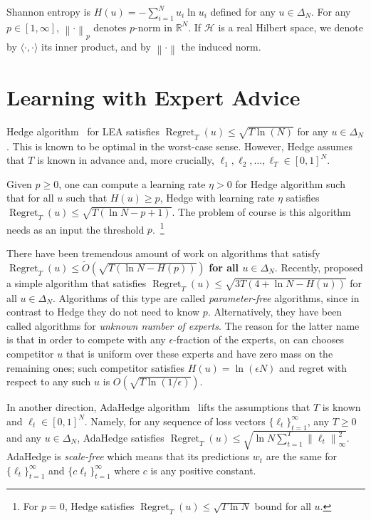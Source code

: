 \documentclass{colt2016} %
\DeclareMathOperator{\Regret}{Regret}
\newcommand{\R}{\mathbb{R}}     %
\renewcommand{\H}{\mathcal{H}}  %
\newcommand{\norm}[1]{\left\|{#1}\right\|}
\begin{document}
Shannon entropy is $H(u) = -\sum_{i=1}^N u_i \ln u_i$ defined for any $u \in
\Delta_N$. For any $p \in [1,\infty]$, $\norm{\cdot}_p$ denotes $p$-norm in
$\R^N$. If $\H$ is a real Hilbert space, we denote by $\langle \cdot, \cdot
\rangle$ its inner product, and by $\norm{\cdot}$ the induced norm.

\section{Learning with Expert Advice}

Hedge algorithm~\citep{Freund-Schapire-1997} for LEA satisfies $\Regret_T(u)
\le \sqrt{T \ln(N)}$ for any $u \in \Delta_N$. This is known to be optimal in
the worst-case sense. However, Hedge assumes that $T$ is known in advance and,
more crucially, $\ell_1, \ell_2, \dots, \ell_T \in [0,1]^N$.

Given $p \ge 0$, one can compute a learning rate $\eta > 0$ for
Hedge algorithm such that for all $u$ such that $H(u) \ge p$, Hedge with
learning rate $\eta$ satisfies $\Regret_T(u) \le \sqrt{T (\ln N - p + 1)}$. The
problem of course is this algorithm needs as an input the threshold
$p$.~\footnote{For $p = 0$, Hedge satisfies  $\Regret_T(u) \le \sqrt{T \ln N}$
bound for all $u$.}

There have been tremendous amount of work \citep{Chaudhuri-Freund-Hsu-2009,
Chernov-Vovk-2010, Koolen-van-Erven-2015, Luo-Schapire-2015} on algorithms that
satisfy $\Regret_T(u) \le \widetilde O(\sqrt{T (\ln N - H(p))})$ \textbf{for all
$u \in \Delta_N$}. Recently, \cite{Orabona-Pal-2016-parameter-free} proposed a
simple algorithm that satisfies $\Regret_T(u) \le \sqrt{3 T(4 + \ln N -
H(u))}$ for all $u \in \Delta_N$. Algorithms of this type are called
\emph{parameter-free} algorithms, since in contrast to Hedge they do not need
to know $p$. Alternatively, they have been called algorithms
for \emph{unknown number of experts}. The reason for the latter name is that in
order to compete with any $\epsilon$-fraction of the experts, on can chooses
competitor $u$ that is uniform over these experts and have zero mass on the
remaining ones; such competitor satisfies $H(u) = \ln (\epsilon N)$ and regret
with respect to any such $u$ is $O(\sqrt{T \ln(1/\epsilon)})$.

In another direction, AdaHedge
algorithm~\citep{de-Rooij-van-Erven-Grunwald-Koolen-2014} lifts the assumptions
that $T$ is known and $\ell_t \in [0,1]^N$. Namely, for any sequence of loss
vectors $\{\ell_t\}_{t=1}^\infty$, any $T \ge 0$ and any $u \in \Delta_N$,
AdaHedge satisfies $\Regret_T(u) \le \sqrt{\ln N \sum_{t=1}^T
\norm{\ell_t}_\infty^2}$. AdaHedge is \emph{scale-free} which means that its
predictions $w_t$ are the same for $\{\ell_t\}_{t=1}^\infty$ and $\{c
\ell_t\}_{t=1}^\infty$ where $c$ is any positive constant.
\end{document}
